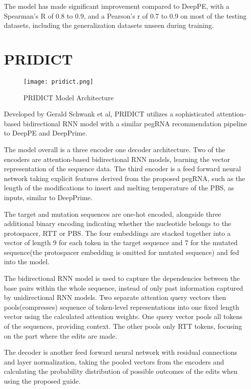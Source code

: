 The model has made significant improvement compared to DeepPE, with a Spearman's R of 0.8 to 0.9, and a Pearson's r of 0.7 to 0.9 on most of the testing datasets, including the generalization datasets unseen during training.

\section{PRIDICT}

\begin{figure}[ht]
    \centering
    \texttt{[image: pridict.png]}
    \caption{PRIDICT Model Architecture}
    \label{fig:pridict}
\end{figure}


Developed by Gerald Schwank et al, PRIDICT utilizes a sophisticated attention-based bidirectional RNN model with a similar pegRNA recommendation pipeline to DeepPE and DeepPrime. 

The model overall is a three encoder one decoder architecture. Two of the encoders are attention-based bidirectional RNN models, learning the vector representation of the sequence data. The third encoder is a feed forward neural network taking explicit features derived from the proposed pegRNA, such as the length of the modifications to insert and melting temperature of the PBS, as inputs, similar to DeepPrime.

The target and mutation sequences are one-hot encoded, alongside three additional binary encoding indicating whether the nucleotide belongs to the protospacer, RTT or PBS. The four embeddings are stacked together into a vector of length 9 for each token in the target sequence and 7 for the mutated sequence(the protospacer embedding is omitted for mutated sequence) and fed into the model.

The bidirectional RNN model is used to capture the dependencies between the base pairs within the whole sequence, instead of only past information captured by unidirectional RNN models. Two separate attention query vectors then pools(compresses) sequence of token-level representations into one fixed length vector using the calculated attention weights. One query vector pools all tokens of the sequences, providing context. The other pools only RTT tokens, focusing on the part where the edits are made. 

The decoder is another feed forward neural network with residual connections and layer normalization, taking the pooled vectors from the encoders and calculating the probability distribution of possible outcomes of the edits when using the proposed guide. 


